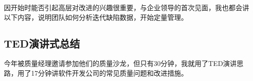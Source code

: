 因开始时能否引起高层对改进的兴趣很重要，与企业领导的首次见面，我也都会讲以下内容，说明团队如何分析迭代缺陷数据，开始定量管理。\\



\hypertarget{tedux6f14ux8bb2ux5f0fux603bux7ed3}{%
\subsection{TED演讲式总结}\label{tedux6f14ux8bb2ux5f0fux603bux7ed3}}

今年被质量经理邀请参加他们的质量沙龙，但只有30分钟，我就用了TED演讲思路，用了17分钟讲软件开发公司的常见质量问题和改进措施。

